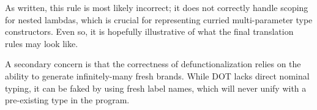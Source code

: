 \documentclass[acmsmall,screen]{acmart}
\begin{document}
\begin{appendices}
  As written, this rule is most likely incorrect; it does not correctly handle
  scoping for nested lambdas, which is crucial for representing curried
  multi-parameter type constructors. Even so, it is hopefully illustrative of
  what the final translation rules may look like.

  A secondary concern is that the correctness of defunctionalization relies on
  the ability to generate infinitely-many fresh brands. While DOT lacks
  direct nominal typing, it can be faked by using fresh label names, which will
  never unify with a pre-existing type in the program.
\end{appendices}
\end{document}
